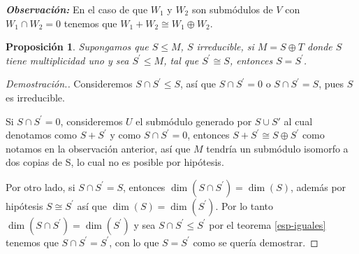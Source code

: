\documentclass[12pt]{book}
\newtheorem{proposition}[theorem]{Proposición}
\theoremstyle{definition}
\newcounter{in}
\newcounter{ini}
\begin{document}
\textbf{\emph{Observación:}} En el caso de que $W_{1}$ y $W_{2}$ son
submódulos de $V$ con $W_{1}\cap W_{2}=0$ tenemos que
$W_{1}+W_{2}\cong W_{1}\oplus W_{2}$.

\begin{proposition}
  \label{modulos-iguales}
  Supongamos que $S\leq M$, $S$ irreducible, si $M=S\oplus T$ donde $S$
  tiene multiplicidad uno y sea $S^{'}\leq M$, tal que $S^{'}\cong S$, entonces $S=S^{'}$.
\end{proposition}

\begin{proof}[Demostración.]
  Consideremos $S\cap S^{'}\leq S$, así que $S\cap S^{'}=0$ o $S\cap
  S^{'}=S$, pues $S$ es irreducible.

  Si $S\cap S^{'}=0$, consideremos $U$ el submódulo generado por $S\cup S'$ al cual
  denotamos como $S+S^{'}$ y como $S\cap S^{'}=0$, entonces
  $S+S^{'}\cong S\oplus S^{'}$ como notamos en la observación anterior,
  así que $M$ tendría un submódulo isomorfo a dos copias de S, lo cual
  no es posible por hipótesis. 
  
 Por otro lado, si $S\cap S^{'}=S$, entonces $\dim (S\cap
 S^{'})=\dim(S)$, además por hipótesis $S\cong S^{'}$ así que
 $\dim(S)=\dim(S^{'})$. Por lo tanto $\dim(S\cap S^{'})=\dim(S^{'})$ y
 sea $S\cap S^{'}\leq S^{'}$ por el teorema \ref{esp-iguales} tenemos
 que $S\cap S^{'}=S^{'}$, con lo que $S=S^{'}$ como se quería demostrar.
\end{proof}
\end{document}
